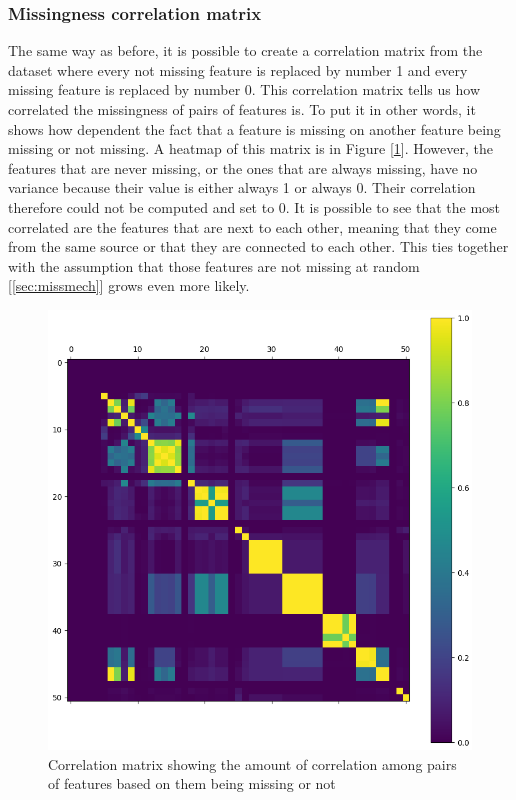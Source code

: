 \documentclass[11pt]{article}
\begin{document}
      \subsubsection{Missingness correlation matrix}
        The same way as before, it is possible to create a correlation matrix from the dataset where every not missing feature is replaced by number 1 and every missing feature is replaced by number 0. This correlation matrix tells us how correlated the missingness of pairs of features is. To put it in other words, it shows how dependent the fact that a feature is missing on another feature being missing or not missing. A heatmap of this matrix is in Figure [\ref{figure:missingness_matrix}]. However, the features that are never missing, or the ones that are always missing, have no variance because their value is either always 1 or always 0. Their correlation therefore could not be computed and set to 0. It is possible to see that the most correlated are the features that are next to each other, meaning that they come from the same source or that they are connected to each other. This ties together with the assumption that those features are not missing at random [\ref{sec:missmech}] grows even more likely.
        \begin{figure}
          \centering
          \caption{Correlation matrix showing the amount of correlation among pairs of features based on them being missing or not}
          \label{figure:missingness_matrix}
          \includegraphics[scale=0.6]{thesis_res/miss/heatmap_cropped.png}
        \end{figure}
      \newpage
\end{document}
